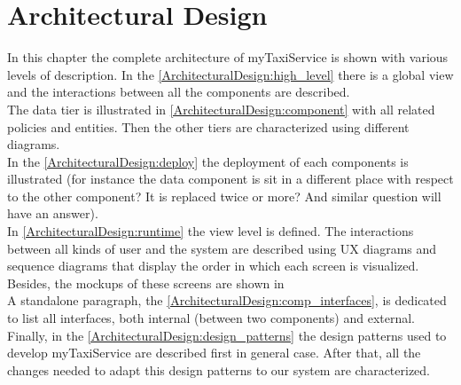 \documentclass[\mainpath/main]{subfiles}
\begin{document}
\chapter{Architectural Design}
\label{architectural_design}

\setmyfancystyle

In this chapter the complete architecture of myTaxiService is shown with various levels of description. In the \autoref{ArchitecturalDesign:high_level} there is a global view and the interactions between all the components are described.\\ 
The data tier is illustrated in \autoref{ArchitecturalDesign:component} with all related policies and entities. Then the other tiers are characterized using different diagrams.\\
In the \autoref{ArchitecturalDesign:deploy} the deployment of each components is illustrated (for instance the data component is sit in a different place with respect to the other component? It is replaced twice or more? And similar question will have an answer).\\
In \autoref{ArchitecturalDesign:runtime} the view level is defined. The interactions between all kinds of user and the system are described using UX diagrams and sequence diagrams that display the order in which each screen is visualized. Besides, the mockups of these screens are shown in %
\\
A standalone paragraph, the \autoref{ArchitecturalDesign:comp_interfaces}, is dedicated to list all interfaces, both internal (between two components) and external.\\
Finally, in the \autoref{ArchitecturalDesign:design_patterns} the design patterns used to develop myTaxiService are described first in general case. After that, all the changes needed to adapt this design patterns to our system are characterized.
\end{document}
